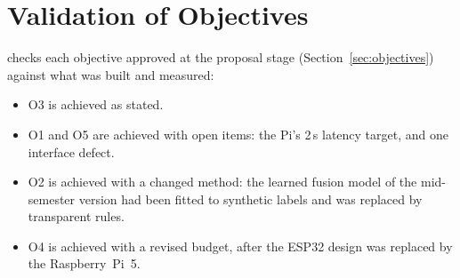 \section{Validation of Objectives}
\label{sec:validation}
 checks each objective approved at the proposal stage (Section~\ref{sec:objectives}) against what was built and measured:
\begin{itemize}
\item O3 is achieved as stated.
\item O1 and O5 are achieved with open items: the Pi's 2\,s latency target, and one interface defect.
\item O2 is achieved with a changed method: the learned fusion model of the mid-semester version had been fitted to synthetic labels and was replaced by transparent rules.
\item O4 is achieved with a revised budget, after the ESP32 design was replaced by the Raspberry~Pi~5.
\end{itemize}

